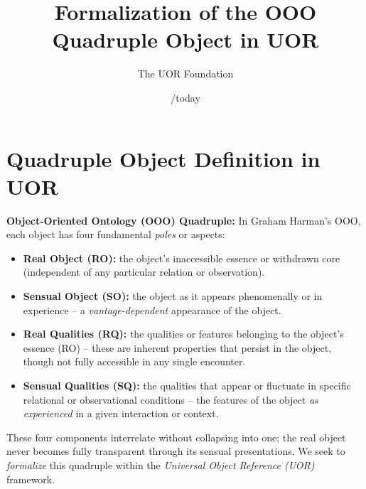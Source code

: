 \documentclass[12pt]{article}
\begin{document}
\title{Formalization of the OOO Quadruple Object in UOR}
\author{The UOR Foundation}
\date{/today}
\maketitle

\section{Quadruple Object Definition in UOR}

\textbf{Object-Oriented Ontology (OOO) Quadruple:} In Graham Harman's OOO, each object has four fundamental \emph{poles} or aspects:
\begin{itemize}
    \item \textbf{Real Object (RO):} the object’s inaccessible essence or withdrawn core (independent of any particular relation or observation).
    \item \textbf{Sensual Object (SO):} the object as it appears phenomenally or in experience -- a \emph{vantage-dependent} appearance of the object.
    \item \textbf{Real Qualities (RQ):} the qualities or features belonging to the object’s essence (RO) -- these are inherent properties that persist in the object, though not fully accessible in any single encounter.
    \item \textbf{Sensual Qualities (SQ):} the qualities that appear or fluctuate in specific relational or observational conditions -- the features of the object \emph{as experienced} in a given interaction or context.
\end{itemize}

These four components interrelate without collapsing into one; the real object never becomes fully transparent through its sensual presentations. We seek to \emph{formalize} this quadruple within the \emph{Universal Object Reference (UOR)} framework.

\medskip
\end{document}

